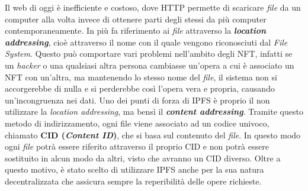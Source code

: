 Il web di oggi è inefficiente e costoso, dove HTTP permette di scaricare \textit{file} da un computer alla volta invece di ottenere parti degli stessi da più computer contemporaneamente. In più fa riferimento ai \textit{file} attraverso la \textbf{\textit{location addressing}}, cioè attraverso il nome con il quale vengono riconosciuti dal \textit{File System}. Questo può comportare vari problemi nell'ambito degli NFT, infatti se un \textit{hacker} o una qualsiasi altra persona cambiasse un'opera a cui è associato un NFT con un'altra, ma mantenendo lo stesso nome del \textit{file}, il sistema non si accorgerebbe di nulla e si perderebbe così l'opera vera e propria, causando un'incongruenza nei dati. 
Uno dei punti di forza di IPFS è proprio il non utilizzare la \textit{location addressing}, ma bensì il \textbf{\textit{content addressing}}. Tramite questo metodo di indirizzamento, ogni file viene associato ad un codice univoco, chiamato \textbf{CID (\textit{Content ID})}, che si basa sul contenuto del \textit{file}. In questo modo ogni \textit{file} potrà essere riferito attraverso il proprio CID e non potrà essere sostituito in alcun modo da altri, visto che avranno un CID diverso.
Oltre a questo motivo, è stato scelto di utilizzare IPFS anche per la sua natura decentralizzata che assicura sempre la reperibilità delle opere richieste. \\



